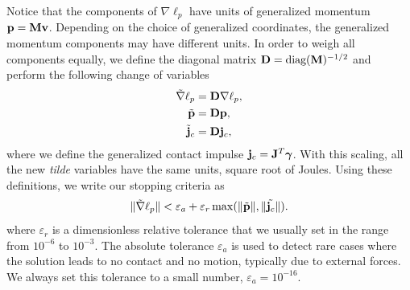 Notice that the components of $\nabla\ell_p$ have units of generalized momentum
${\mathbf{p}}={\mathbf{M}}{\mathbf{v}}$. Depending on the choice of generalized coordinates, the
generalized momentum components may have different units. In order to weigh all
components equally, we define the diagonal matrix ${\mathbf{D}} =
\text{diag}({\mathbf{M}})^{-1/2}$ and perform the following change of variables
\begin{align}
	\tilde{\nabla}\ell_p &= \mf{D}\nabla\ell_p, \nonumber\\
	\tilde{\mf{p}} &= \mf{D}\mf{p}, \nonumber \\
	\tilde{\mf{j}}_c &= \mf{D}\mf{j}_c,
	\label{eq:scaled_momentum_quantities}
\end{align}
where we define the generalized contact impulse ${\mathbf{j}}_c={\mathbf{J}}^T{\bm\gamma}$.
With this scaling, all the new \emph{tilde} variables have the same units,
square root of Joules. Using these definitions, we write our stopping criteria
as
\begin{equation}
	\Vert\tilde{\nabla}\ell_p\Vert < \varepsilon_a + \varepsilon_r\max(\Vert\tilde{\mf{p}}\Vert,\Vert\tilde{\mf{j}_c}\Vert).
	\label{eq:stopping_criteria}
\end{equation}
where $\varepsilon_r$ is a dimensionless relative tolerance that we usually set
in the range from $10^{-6}$ to $10^{-3}$. The absolute tolerance $\varepsilon_a$
is used to detect rare cases where the solution leads to no contact and no
motion, typically due to external forces. We always set this tolerance to a
small number, $\varepsilon_a=10^{-16}$.
